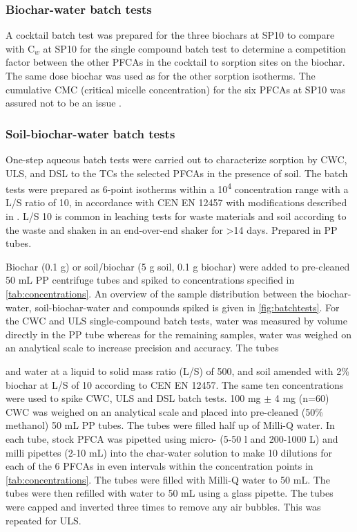 \subsubsection{Biochar-water batch tests}


A cocktail batch test was prepared for the three biochars at SP10 to compare with C$_w$ at SP10 for the single compound batch test to determine a competition factor between the other PFCAs in the cocktail to sorption sites on the biochar. The same dose biochar was used as for the other sorption isotherms. The cumulative CMC (critical micelle concentration) for the six PFCAs at SP10 was assured not to be an issue \citep{bhhatarai2011}. 

\subsubsection{Soil-biochar-water batch tests}
One-step aqueous batch tests were carried out to characterize sorption by CWC, ULS, and DSL to the TCs the selected PFCAs in the presence of soil. The batch tests were prepared as 6-point isotherms within a 10\textsuperscript{4} concentration range with a L/S ratio of 10, in accordance with CEN EN 12457 with modifications described in \citep{Hale2017fire,Kupryianchyk2016a}. L/S 10  is common in leaching tests for waste materials and soil according to the waste and shaken in an end-over-end shaker for \textgreater 14 days. Prepared in PP tubes. 

Biochar (0.1 g) or soil/biochar (5 g soil, 0.1 g biochar) were added to pre-cleaned 50 mL PP centrifuge tubes and spiked to concentrations specified in \cref{tab:concentrations}. An overview of the sample distribution between the biochar-water, soil-biochar-water and compounds spiked is given in \cref{fig:batchtests}. For the CWC and ULS single-compound batch tests, water was measured by volume directly in the PP tube whereas for the remaining samples, water was weighed on an analytical scale to increase precision and accuracy. The tubes


and water at a liquid to solid mass ratio (L/S) of 500, and soil amended with 2\% biochar at L/S of 10 according to CEN EN 12457. 
The same ten concentrations were used to spike CWC, ULS and DSL batch tests. 100 mg $\pm$ 4 mg (n=60) CWC was weighed on an analytical scale and placed into pre-cleaned (50\% methanol) 50 mL PP tubes. The tubes were filled half up of Milli-Q water. In each tube, stock PFCA was pipetted using micro- (5-50 {\textmu}l and 200-1000 {\textmu}L) and milli pipettes (2-10 mL) into the char-water solution to make 10 dilutions for each of the 6 PFCAs in even intervals within the concentration points in \cref{tab:concentrations}. The tubes were filled with Milli-Q water to 50 mL. The tubes were then refilled with water to 50 mL using a glass pipette. The tubes were capped and inverted three times to remove any air bubbles. This was repeated for ULS. 

